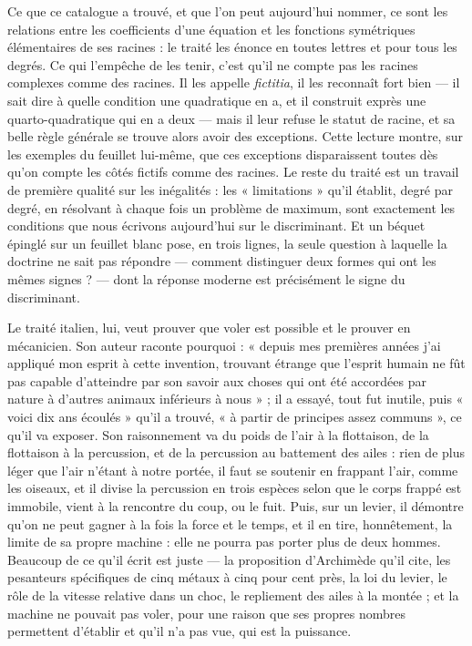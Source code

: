 \documentclass[11pt,a4paper]{article}
\begin{document}
\begin{resume}
Ce que ce catalogue a trouvé, et que l'on peut aujourd'hui nommer, ce sont les
relations entre les coefficients d'une équation et les fonctions symétriques
élémentaires de ses racines : le traité les énonce en toutes lettres et pour
tous les degrés. Ce qui l'empêche de les tenir, c'est qu'il ne compte pas les
racines complexes comme des racines. Il les appelle \emph{fictitia}, il les
reconnaît fort bien — il sait dire à quelle condition une quadratique en a, et
il construit exprès une quarto-quadratique qui en a deux — mais il leur refuse
le statut de racine, et sa belle règle générale se trouve alors avoir des
exceptions. Cette lecture montre, sur les exemples du feuillet lui-même, que ces
exceptions disparaissent toutes dès qu'on compte les côtés fictifs comme des
racines. Le reste du traité est un travail de première qualité sur les
inégalités : les « limitations » qu'il établit, degré par degré, en résolvant à
chaque fois un problème de maximum, sont exactement les conditions que nous
écrivons aujourd'hui sur le discriminant. Et un béquet épinglé sur un feuillet
blanc pose, en trois lignes, la seule question à laquelle la doctrine ne sait
pas répondre — comment distinguer deux formes qui ont les mêmes signes ? — dont
la réponse moderne est précisément le signe du discriminant.

Le traité italien, lui, veut prouver que voler est possible et le prouver en
mécanicien. Son auteur raconte pourquoi : « depuis mes premières années j'ai
appliqué mon esprit à cette invention, trouvant étrange que l'esprit humain ne
fût pas capable d'atteindre par son savoir aux choses qui ont été accordées par
nature à d'autres animaux inférieurs à nous » ; il a essayé, tout fut inutile,
puis « voici dix ans écoulés » qu'il a trouvé, « à partir de principes assez
communs », ce qu'il va exposer. Son raisonnement va du poids de l'air à la
flottaison, de la flottaison à la percussion, et de la percussion au battement
des ailes : rien de plus léger que l'air n'étant à notre portée, il faut se
soutenir en frappant l'air, comme les oiseaux, et il divise la percussion en
trois espèces selon que le corps frappé est immobile, vient à la rencontre du
coup, ou le fuit. Puis, sur un levier, il démontre qu'on ne peut gagner à la
fois la force et le temps, et il en tire, honnêtement, la limite de sa propre
machine : elle ne pourra pas porter plus de deux hommes. Beaucoup de ce qu'il
écrit est juste — la proposition d'Archimède qu'il cite, les pesanteurs
spécifiques de cinq métaux à cinq pour cent près, la loi du levier, le rôle de
la vitesse relative dans un choc, le repliement des ailes à la montée ; et la
machine ne pouvait pas voler, pour une raison que ses propres nombres
permettent d'établir et qu'il n'a pas vue, qui est la puissance.


\end{resume}
\end{document}
